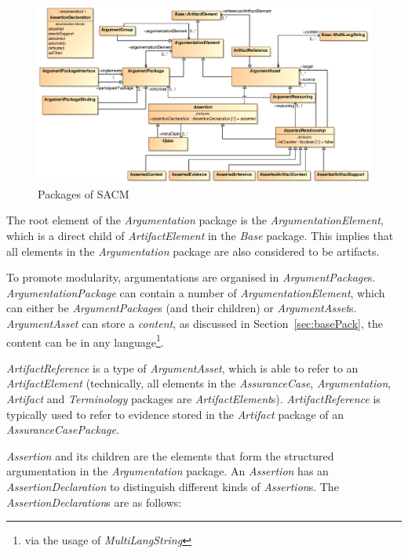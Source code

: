 \begin{figure}
	\centering
	\includegraphics[width=1\linewidth]{fig/Argumentation.eps}
	\caption{Packages of SACM}
	\label{fig:arg}
\end{figure}
The root element of the \textit{Argumentation} package is the \textit{ArgumentationElement}, which is a direct child of \textit{ArtifactElement} in the \textit{Base} package. This implies that all elements in the \textit{Argumentation} package are also considered to be artifacts. 

To promote modularity, argumentations are organised in \textit{ArgumentPackage}s. \textit{ArgumentationPackage} can contain a number of \textit{ArgumentationElement}, which can either be \textit{ArgumentPackage}s (and their children) or \textit{ArgumentAsset}s. \textit{ArgumentAsset} can store a \textit{content}, as discussed in Section~\ref{sec:basePack}, the content can be in any language\footnote{via the usage of \textit{MultiLangString}}.

\textit{ArtifactReference} is a type of \textit{ArgumentAsset}, which is able to refer to an \textit{ArtifactElement} (technically, all elements in the \textit{AssuranceCase}, \textit{Argumentation}, \textit{Artifact} and \textit{Terminology} packages are \textit{ArtifactElement}s). \textit{ArtifactReference} is typically used to refer to evidence stored in the \textit{Artifact} package of an \textit{AssuranceCasePackage}. 

\textit{Assertion} and its children are the elements that form the structured argumentation in the \textit{Argumentation} package. An \textit{Assertion} has an \textit{AssertionDeclaration} to distinguish different kinds of \textit{Assertion}s. The \textit{AssertionDeclaration}s are as follows: 

